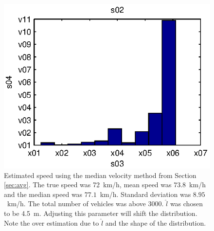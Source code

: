 \begin{figure}
\begin{minipage}{0.45\linewidth}
 \end{minipage}
\hfill
 \begin{minipage}{0.45\linewidth}
 \centering
 
 \includegraphics[width=1\linewidth]{images/speedmed_hist}
 \caption[Estimated speed using the median velocity method.]{Estimated speed using the median velocity method from Section \ref{sec:avg}. The true speed was \mbox{72 km/h}, mean speed was \mbox{$73.8$~km/h} and the median speed was \mbox{$77.1$~km/h}. Standard deviation was \mbox{$8.95$~km/h}. The total number of vehicles was above 3000. $\hat{l}$ was chosen to be \mbox{4.5 m}. Adjusting this parameter will shift the distribution. Note the over estimation due to $\hat{l}$ and the shape of the distribution.\\}
 \label{fig:speedmed_hist}
 \end{minipage}
\end{figure}


